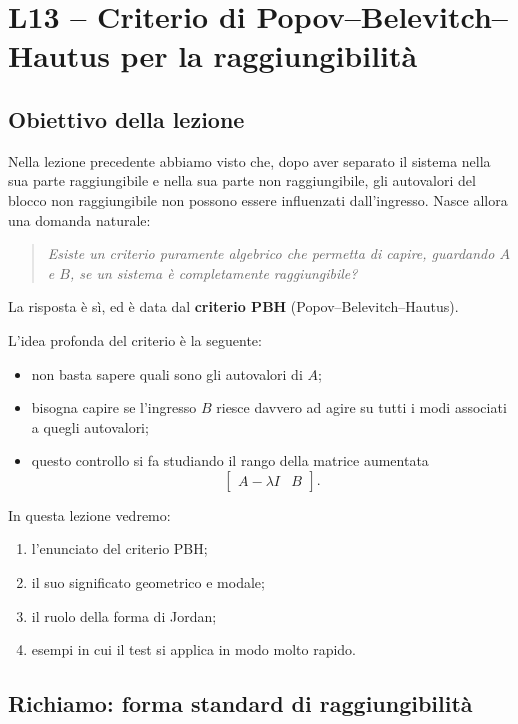 \chapter{L13 -- Criterio di Popov--Belevitch--Hautus per la raggiungibilità}

\section{Obiettivo della lezione}

Nella lezione precedente abbiamo visto che, dopo aver separato il sistema nella sua parte raggiungibile e nella sua parte non raggiungibile, gli autovalori del blocco non raggiungibile non possono essere influenzati dall’ingresso.  
Nasce allora una domanda naturale:

\begin{quote}
\emph{Esiste un criterio puramente algebrico che permetta di capire, guardando \(A\) e \(B\), se un sistema è completamente raggiungibile?}
\end{quote}

La risposta è sì, ed è data dal \textbf{criterio PBH} (Popov--Belevitch--Hautus).

L’idea profonda del criterio è la seguente:
\begin{itemize}
    \item non basta sapere quali sono gli autovalori di \(A\);
    \item bisogna capire se l’ingresso \(B\) riesce davvero ad agire su tutti i modi associati a quegli autovalori;
    \item questo controllo si fa studiando il rango della matrice aumentata
    \[
    \begin{bmatrix}
    A-\lambda I & B
    \end{bmatrix}.
    \]
\end{itemize}

In questa lezione vedremo:
\begin{enumerate}
    \item l’enunciato del criterio PBH;
    \item il suo significato geometrico e modale;
    \item il ruolo della forma di Jordan;
    \item esempi in cui il test si applica in modo molto rapido.
\end{enumerate}

\section{Richiamo: forma standard di raggiungibilità}

